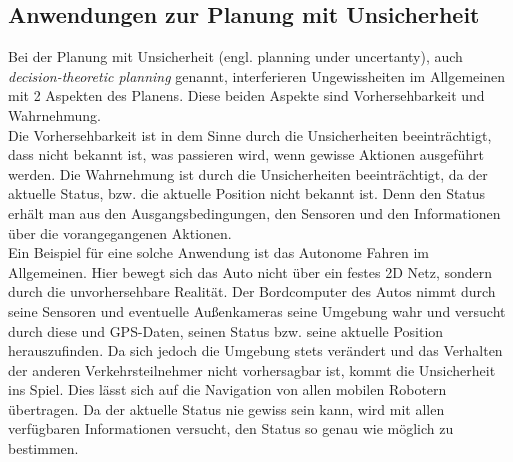 \subsection{Anwendungen zur Planung mit Unsicherheit}
Bei der Planung mit Unsicherheit (engl. planning under uncertanty), auch \textit{decision-theoretic planning} genannt, interferieren Ungewissheiten im Allgemeinen mit 2 Aspekten des Planens. Diese beiden Aspekte sind Vorhersehbarkeit und Wahrnehmung. \cite[~S. 435 ff.]{Lav06}\\
Die Vorhersehbarkeit ist in dem Sinne durch die Unsicherheiten beeinträchtigt, dass nicht bekannt ist, was passieren wird, wenn gewisse Aktionen ausgeführt werden. Die Wahrnehmung ist durch die Unsicherheiten beeinträchtigt, da der aktuelle Status, bzw. die aktuelle Position nicht bekannt ist. Denn den Status erhält man aus den Ausgangsbedingungen, den Sensoren und den Informationen über die vorangegangenen Aktionen.\\
Ein Beispiel für eine solche Anwendung ist das Autonome Fahren im Allgemeinen. %
 Hier bewegt sich das Auto nicht über ein festes 2D Netz, sondern durch die unvorhersehbare Realität. Der Bordcomputer des Autos nimmt durch seine Sensoren und eventuelle Außenkameras seine Umgebung wahr und versucht durch diese und GPS-Daten, seinen Status bzw. seine aktuelle Position herauszufinden. Da sich jedoch die Umgebung stets verändert und das Verhalten der anderen Verkehrsteilnehmer nicht vorhersagbar ist, kommt die Unsicherheit ins Spiel.
Dies lässt sich auf die Navigation von allen mobilen Robotern übertragen.
Da der aktuelle Status nie gewiss sein kann, wird mit allen verfügbaren Informationen versucht, den Status so genau wie möglich zu bestimmen.
